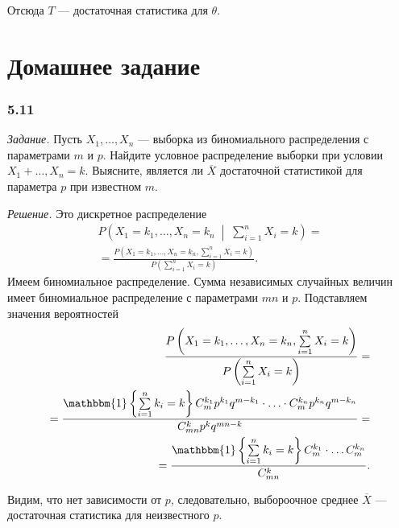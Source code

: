 Отсюда $T$ --- достаточная статистика для $ \theta $.

\section*{Домашнее задание}

\subsubsection*{5.11}

\textit{Задание.}
Пусть $X_1, \dotsc, X_n$ --- выборка из биномиального распределения с параметрами $m$ и $p$.
Найдите условное распределение выборки при условии $X_1 + \dotsc, X_n = k$.
Выясните, является ли $ \overline{X}$ достаточной статистикой для параметра $p$ при известном $m$.

\textit{Решение.} Это дискретное распределение
\begin{equation*}
  \begin{split}
    P \left( X_1 = k_1, \dotsc, X_n = k_n \; \middle| \; \sum \limits_{i = 1}^n X_i = k \right) = \\
    = \frac{P \left( X_1 = k_1, \dotsc, X_n = k_n, \sum \limits_{i = 1}^n X_i = k \right) }{P \left( \sum \limits_{i = 1}^n X_i = k \right) }.
  \end{split}
\end{equation*}
Имеем биномиальное распределение.
Сумма независимых случайных величин имеет биномиальное распределение с параметрами $mn$ и $p$.
Подставляем значения вероятностей
\begin{equation*}
  \begin{split}
    \frac{P \left( X_1 = k_1, \dotsc, X_n = k_n, \sum \limits_{i = 1}^n X_i = k \right) }{P \left( \sum \limits_{i = 1}^n X_i = k \right) } = \\
    = \frac{ \mathbbm{1} \left\{ \sum \limits_{i = 1}^n k_i = k \right\} C_m^{k_1} p^{k_1} q^{m - k_1} \cdot \dotsc \cdot C_m^{k_n} p^{k_n} q^{m - k_n}}{C_{mn}^k p^k q^{mn-k}} = \\
    = \frac{ \mathbbm{1} \left\{ \sum \limits_{i = 1}^n k_i = k \right\} C_m^{k_1} \cdot \dotsc C_m^{k_n}}{C_{mn}^k}.
  \end{split}
\end{equation*}

Видим, что нет зависимости от $p$, следовательно, выбороочное среднее $ \overline{X}$ ---
достаточная статистика для неизвестного $p$.
